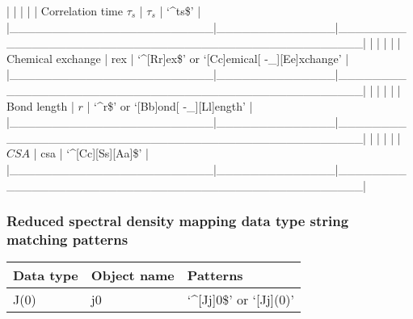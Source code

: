 |                        |              |                                                  |
| Correlation time $\tau_s$    | $\tau_s$           | `\^{}ts\$'                                           |
|\_\_\_\_\_\_\_\_\_\_\_\_\_\_\_\_\_\_\_\_\_\_\_\_|\_\_\_\_\_\_\_\_\_\_\_\_\_\_|\_\_\_\_\_\_\_\_\_\_\_\_\_\_\_\_\_\_\_\_\_\_\_\_\_\_\_\_\_\_\_\_\_\_\_\_\_\_\_\_\_\_\_\_\_\_\_\_\_\_|
|                        |              |                                                  |
| Chemical exchange      | rex          | `\^{}[Rr]ex\$' or `[Cc]emical[ -\_][Ee]xchange'       |
|\_\_\_\_\_\_\_\_\_\_\_\_\_\_\_\_\_\_\_\_\_\_\_\_|\_\_\_\_\_\_\_\_\_\_\_\_\_\_|\_\_\_\_\_\_\_\_\_\_\_\_\_\_\_\_\_\_\_\_\_\_\_\_\_\_\_\_\_\_\_\_\_\_\_\_\_\_\_\_\_\_\_\_\_\_\_\_\_\_|
|                        |              |                                                  |
| Bond length            | $r$            | `\^{}r\$' or `[Bb]ond[ -\_][Ll]ength'                 |
|\_\_\_\_\_\_\_\_\_\_\_\_\_\_\_\_\_\_\_\_\_\_\_\_|\_\_\_\_\_\_\_\_\_\_\_\_\_\_|\_\_\_\_\_\_\_\_\_\_\_\_\_\_\_\_\_\_\_\_\_\_\_\_\_\_\_\_\_\_\_\_\_\_\_\_\_\_\_\_\_\_\_\_\_\_\_\_\_\_|
|                        |              |                                                  |
| $CSA$                    | csa          | `\^{}[Cc][Ss][Aa]\$'                                 |
|\_\_\_\_\_\_\_\_\_\_\_\_\_\_\_\_\_\_\_\_\_\_\_\_|\_\_\_\_\_\_\_\_\_\_\_\_\_\_|\_\_\_\_\_\_\_\_\_\_\_\_\_\_\_\_\_\_\_\_\_\_\_\_\_\_\_\_\_\_\_\_\_\_\_\_\_\_\_\_\_\_\_\_\_\_\_\_\_\_|




\subsubsection{Reduced spectral density mapping data type string matching patterns}



\begin{center}
\begin{tabular}{lll}
\toprule
Data type & Object name & Patterns \\
\midrule
 J(0)                    &  j0            &  `\^{}[Jj]0\$' or `[Jj](0)'                            \\
\bottomrule
\end{tabular}
\end{center}

